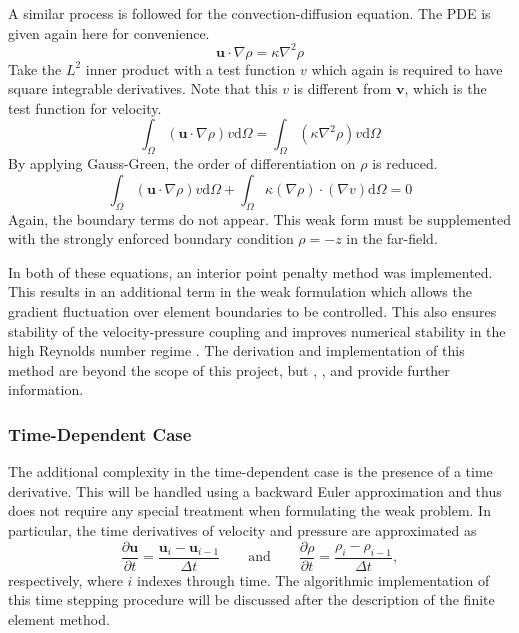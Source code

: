 \documentclass[12pt]{article}
\begin{document}
A similar process is followed for the convection-diffusion equation. The PDE  is given again here for convenience.
\begin{equation}
\mathbf{u}\cdot\nabla\rho=\kappa\nabla^2\rho
\end{equation}
Take the $L^2$ inner product with a test function $v$ which again is required to have square integrable derivatives. Note that this $v$ is different from $\mathbf{v}$, which is the test function for velocity.
\begin{equation}
\int_\Omega(\mathbf{u}\cdot\nabla\rho)v\text{d}\Omega=\int_\Omega(\kappa\nabla^2\rho)v\text{d}\Omega
\end{equation}
By applying Gauss-Green, the order of differentiation on $\rho$ is reduced.
\begin{equation}
\int_\Omega(\mathbf{u}\cdot\nabla\rho)v\text{d}\Omega+\int_\Omega\kappa(\nabla\rho)\cdot(\nabla  v)\text{d}\Omega=0
\end{equation}
Again, the boundary terms do not appear. This weak form must be supplemented with the strongly enforced boundary condition $\rho=-z$ in the far-field.

In both of these equations, an interior point penalty method was implemented. This results in an additional term in the weak formulation which allows the gradient fluctuation over element boundaries to be controlled. This also ensures stability of the velocity-pressure coupling and improves numerical stability in the high Reynolds number regime \cite{email}. The derivation and implementation of this method are beyond the scope of this project, but \cite{Burman:103001}, \cite{BurmanOseen}, and \cite{Burman2007} provide further information.

\subsubsection{Time-Dependent Case}

The additional complexity in the time-dependent case is the presence of a time derivative. This will be handled using a backward Euler approximation and thus does not require any special treatment when formulating the weak problem. In particular, the time derivatives of velocity and pressure are approximated as
\begin{equation}
\frac{\partial \mathbf{u}}{\partial t}=\frac{\mathbf{u}_i-\mathbf{u}_{i-1}}{\Delta t}\qquad\text{and}\qquad\frac{\partial \rho}{\partial t}=\frac{\rho_i-\rho_{i-1}}{\Delta t},
\end{equation}
respectively, where $i$ indexes through time. The algorithmic implementation of this time stepping procedure will be discussed after the description of the finite element method.
\end{document}
